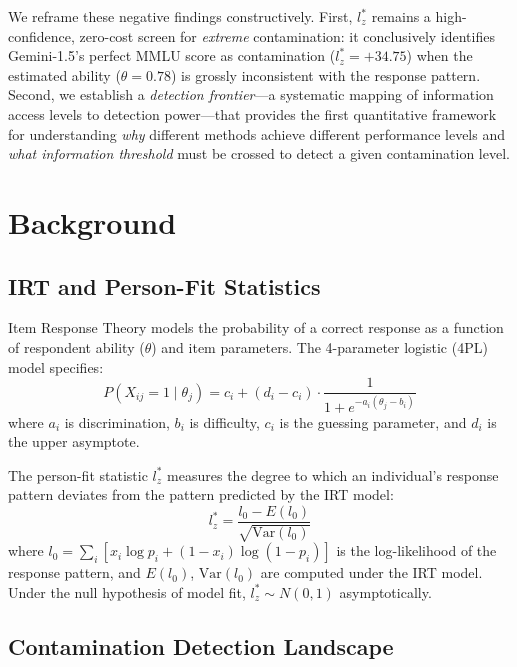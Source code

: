 \documentclass[11pt,a4paper]{article}
\newcommand{\lzstar}{$l_{z}^{*}$}
\begin{document}
We reframe these negative findings constructively. First, \lzstar{} remains a high-confidence, zero-cost screen for \emph{extreme} contamination: it conclusively identifies Gemini-1.5's perfect MMLU score as contamination ($l_z^* = +34.75$) when the estimated ability ($\theta = 0.78$) is grossly inconsistent with the response pattern. Second, we establish a \emph{detection frontier}---a systematic mapping of information access levels to detection power---that provides the first quantitative framework for understanding \emph{why} different methods achieve different performance levels and \emph{what information threshold} must be crossed to detect a given contamination level.

\section{Background}

\subsection{IRT and Person-Fit Statistics}

Item Response Theory models the probability of a correct response as a function of respondent ability ($\theta$) and item parameters. The 4-parameter logistic (4PL) model specifies:
\begin{equation}
P(X_{ij} = 1 \mid \theta_j) = c_i + (d_i - c_i) \cdot \frac{1}{1 + e^{-a_i(\theta_j - b_i)}}
\end{equation}
where $a_i$ is discrimination, $b_i$ is difficulty, $c_i$ is the guessing parameter, and $d_i$ is the upper asymptote.

The person-fit statistic $l_z^*$ \citep{snijders2001} measures the degree to which an individual's response pattern deviates from the pattern predicted by the IRT model:
\begin{equation}
l_z^* = \frac{l_0 - E(l_0)}{\sqrt{\text{Var}(l_0)}}
\end{equation}
where $l_0 = \sum_i [x_i \log p_i + (1-x_i)\log(1-p_i)]$ is the log-likelihood of the response pattern, and $E(l_0)$, $\text{Var}(l_0)$ are computed under the IRT model. Under the null hypothesis of model fit, $l_z^* \sim N(0,1)$ asymptotically.

\subsection{Contamination Detection Landscape}
\end{document}
